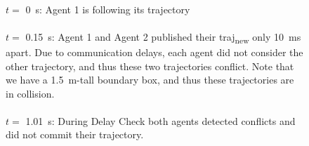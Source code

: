 \begin{figure}[!htbp]
    \centering
    \\ {\scriptsize $t=$ \SI{0}{\s}: Agent 1 is following its trajectory} \\[1em]
    \\ {\scriptsize $t=$ \SI{0.15}{\s}: Agent 1 and Agent 2 published their traj\textsubscript{new} only \SI{10}{\ms} apart. Due to communication delays, each agent did not consider the other trajectory, and thus these two trajectories conflict. Note that we have a \SI{1.5}{\m}-tall boundary box, and thus these trajectories are in collision.} \\[1em]
    \\ {\scriptsize $t=$ \SI{1.01}{\s}: During Delay Check both agents detected conflicts and did not commit their trajectory.} \\[1em]

\end{figure}
